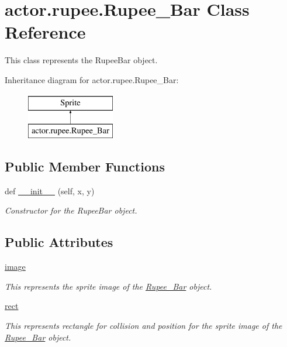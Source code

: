\hypertarget{classactor_1_1rupee_1_1_rupee___bar}{}\section{actor.\+rupee.\+Rupee\+\_\+\+Bar Class Reference}
\label{classactor_1_1rupee_1_1_rupee___bar}


This class represents the Rupee\+Bar object.  


Inheritance diagram for actor.\+rupee.\+Rupee\+\_\+\+Bar\+:\begin{figure}[H]
\begin{center}
\leavevmode
\includegraphics[height=2.000000cm]{classactor_1_1rupee_1_1_rupee___bar}
\end{center}
\end{figure}
\subsection*{Public Member Functions}
\begin{DoxyCompactItemize}
\item 
def \hyperlink{classactor_1_1rupee_1_1_rupee___bar_acd0085452fdaff7478db209487bc8a80}{\+\_\+\+\_\+init\+\_\+\+\_\+} (self, x, y)
\begin{DoxyCompactList}\small\item\em Constructor for the Rupee\+Bar object. \end{DoxyCompactList}\end{DoxyCompactItemize}
\subsection*{Public Attributes}
\begin{DoxyCompactItemize}
\item 
\hyperlink{classactor_1_1rupee_1_1_rupee___bar_a8a0f7e6f0ac2c12e172d691e2fe4aba4}{image}
\begin{DoxyCompactList}\small\item\em This represents the sprite image of the \hyperlink{classactor_1_1rupee_1_1_rupee___bar}{Rupee\+\_\+\+Bar} object. \end{DoxyCompactList}\item 
\hyperlink{classactor_1_1rupee_1_1_rupee___bar_ace89c66353c7b26fafa8a52a5fec2733}{rect}
\begin{DoxyCompactList}\small\item\em This represents rectangle for collision and position for the sprite image of the \hyperlink{classactor_1_1rupee_1_1_rupee___bar}{Rupee\+\_\+\+Bar} object. \end{DoxyCompactList}\end{DoxyCompactItemize}


